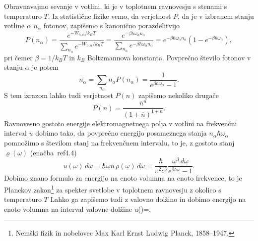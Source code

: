 Obravnavajmo sevanje v votlini, ki je v toplotnem ravnovesju s stenami s temperaturo
$T$. Iz statistične fizike vemo, da verjetnost $P$, da je v izbranem stanju 
votline $\alpha$ $n_{\alpha}$ fotonov, zapišemo s kanonično porazdelitvijo
\begin{equation}
P(n_{\alpha})=\frac{e^{-W_{n,\alpha}/k_BT}}{\sum_{n_{\alpha}}e^{-W_{n,\alpha}/k_BT}} = 
\frac{e^{-\beta\hbar\omega_{\alpha}n_{\alpha}}}
{\sum_{n_{\alpha}}e^{-\beta\hbar\omega_{\alpha}n_{\alpha}}}=
e^{-\beta\hbar\omega_{\alpha}n_{\alpha}}(1-e^{-\beta\hbar\omega_{\alpha}}),
\label{4.12}
\end{equation}
pri čemer $\beta = 1/k_BT$ in $k_B$ Boltzmannova konstanta. Povprečno število fotonov 
v stanju $\alpha$ je potem
\begin{equation}
\overline{n_{\alpha}}=\sum_{n_{\alpha}}n_{\alpha}P(n_{\alpha})=\frac{1}{e^{\beta\hbar\omega_{\alpha}}-1}.
\label{4.13}
\end{equation}
S tem izrazom lahko tudi verjetnost $P(n)$ zapišemo nekoliko drugače
\begin{equation}
P(n)=\frac{\overline{n}^{n}}{(1+\overline{n})^{1+n}}.
\label{4.14}
\end{equation}
Ravnovesno gostoto energije elektromagnetnega polja v votlini na
frekvenčni interval $u$ dobimo tako, da povprečno energijo posameznega
stanja $n_{\alpha}\hbar\omega_{\alpha}$ pomnožimo s številom stanj
na frekvenčnem intervalu, to je, z gostoto stanj $\varrho (\omega)$ 
(enačba~ref{4.4})
\begin{equation}
u(\omega)\, d\omega=\hbar\omega\overline{n}\, \rho(\omega)\, 
d\omega=\frac{\hbar}{\pi^{2}c^{3}}\frac{\omega^{3}\, d\omega}{e^{\beta\hbar\omega}-1}.
\label{4.15}
\end{equation}
Dobimo znano formulo za energijo na enoto volumna na enoto frekvence, 
to je Planckov 
zakon\footnote{Nemški fizik in nobelovec Max Karl Ernst Ludwig Planck, 1858--1947.} 
za spekter svetlobe v toplotnem ravnovesju z okolico s temperaturo $T$
Lahko ga zapišemo tudi z valovno dolžino in dobimo energijo na enoto volumna
na interval valovne dolžine
\beq
u(\lambda)=.
\eeq
